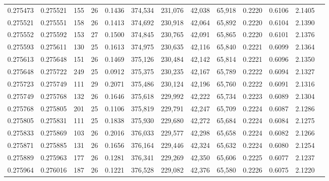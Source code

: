\begin{tabular}{rrrrrrrrrrrrr}
0.275473 & 0.275521 &   155 &  26 &                                     0.1436 & 374,534 & 231,076 &  42,038 &  65,918 & 0.2220 & 0.6106 & 2.1405 \\
0.275521 & 0.275551 &   158 &  26 &                                     0.1413 & 374,692 & 230,918 &  42,064 &  65,892 & 0.2220 & 0.6104 & 2.1390 \\
0.275552 & 0.275592 &   153 &  27 &                                     0.1500 & 374,845 & 230,765 &  42,091 &  65,865 & 0.2220 & 0.6101 & 2.1376 \\
0.275593 & 0.275611 &   130 &  25 &                                     0.1613 & 374,975 & 230,635 &  42,116 &  65,840 & 0.2221 & 0.6099 & 2.1364 \\
0.275613 & 0.275648 &   151 &  26 &                                     0.1469 & 375,126 & 230,484 &  42,142 &  65,814 & 0.2221 & 0.6096 & 2.1350 \\
0.275648 & 0.275722 &   249 &  25 &                                     0.0912 & 375,375 & 230,235 &  42,167 &  65,789 & 0.2222 & 0.6094 & 2.1327 \\
0.275723 & 0.275749 &   111 &  29 &                                     0.2071 & 375,486 & 230,124 &  42,196 &  65,760 & 0.2222 & 0.6091 & 2.1316 \\
0.275749 & 0.275768 &   132 &  26 &                                     0.1646 & 375,618 & 229,992 &  42,222 &  65,734 & 0.2223 & 0.6089 & 2.1304 \\
0.275768 & 0.275805 &   201 &  25 &                                     0.1106 & 375,819 & 229,791 &  42,247 &  65,709 & 0.2224 & 0.6087 & 2.1286 \\
0.275805 & 0.275831 &   111 &  25 &                                     0.1838 & 375,930 & 229,680 &  42,272 &  65,684 & 0.2224 & 0.6084 & 2.1275 \\
0.275833 & 0.275869 &   103 &  26 &                                     0.2016 & 376,033 & 229,577 &  42,298 &  65,658 & 0.2224 & 0.6082 & 2.1266 \\
0.275871 & 0.275885 &   131 &  26 &                                     0.1656 & 376,164 & 229,446 &  42,324 &  65,632 & 0.2224 & 0.6080 & 2.1254 \\
0.275889 & 0.275963 &   177 &  26 &                                     0.1281 & 376,341 & 229,269 &  42,350 &  65,606 & 0.2225 & 0.6077 & 2.1237 \\
0.275964 & 0.276016 &   187 &  26 &                                     0.1221 & 376,528 & 229,082 &  42,376 &  65,580 & 0.2226 & 0.6075 & 2.1220 \\

\end{tabular}
